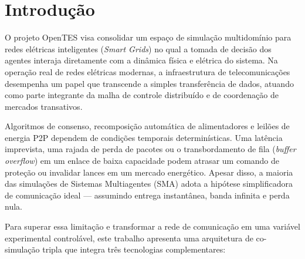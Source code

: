 \documentclass[10pt,twocolumn,a4paper]{article}
\begin{document}
\section{Introdução}

O projeto OpenTES visa consolidar um espaço de simulação multidomínio para redes elétricas inteligentes (\textit{Smart Grids}) no qual a tomada de decisão dos agentes interaja diretamente com a dinâmica física e elétrica do sistema. Na operação real de redes elétricas modernas, a infraestrutura de telecomunicações desempenha um papel que transcende a simples transferência de dados, atuando como parte integrante da malha de controle distribuído e de coordenação de mercados transativos.

Algoritmos de consenso, recomposição automática de alimentadores e leilões de energia P2P dependem de condições temporais determinísticas. Uma latência imprevista, uma rajada de perda de pacotes ou o transbordamento de fila (\textit{buffer overflow}) em um enlace de baixa capacidade podem atrasar um comando de proteção ou invalidar lances em um mercado energético. Apesar disso, a maioria das simulações de Sistemas Multiagentes (SMA) adota a hipótese simplificadora de comunicação ideal — assumindo entrega instantânea, banda infinita e perda nula.

Para superar essa limitação e transformar a rede de comunicação em uma variável experimental controlável, este trabalho apresenta uma arquitetura de co-simulação tripla que integra três tecnologias complementares:
\end{document}
